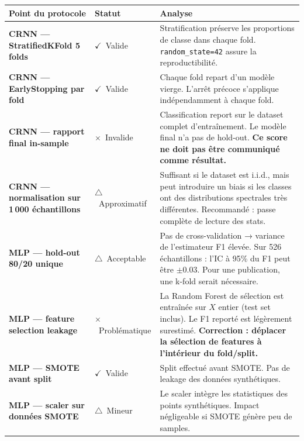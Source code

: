 \documentclass[11pt,a4paper]{article}
\newcommand{\param}[1]{\texttt{#1}}
\newcommand{\ok}{{\color{okborder}$\checkmark$}}
\newcommand{\warn}{{\color{warnborder}$\triangle$}}
\newcommand{\fail}{{\color{dangerBorder}$\times$}}
\begin{document}
\begin{table}[h!]
\centering
\renewcommand{\arraystretch}{1.5}
\begin{tabular}{p{5.5cm}p{1.5cm}p{7cm}}
\toprule
\textbf{Point du protocole} & \textbf{Statut} & \textbf{Analyse} \\
\midrule

\textbf{CRNN — StratifiedKFold 5 folds}
& \ok~Valide
& Stratification préserve les proportions de classe dans chaque fold.
  \param{random\_state=42} assure la reproductibilité. \\

\textbf{CRNN — EarlyStopping par fold}
& \ok~Valide
& Chaque fold repart d'un modèle vierge. L'arrêt précoce s'applique
  indépendamment à chaque fold. \\

\textbf{CRNN — rapport final in-sample}
& \fail~Invalide
& Classification report sur le dataset complet d'entraînement.
  Le modèle final n'a pas de hold-out.
  \textbf{Ce score ne doit pas être communiqué comme résultat.} \\

\textbf{CRNN — normalisation sur 1\,000 échantillons}
& \warn~Approximatif
& Suffisant si le dataset est i.i.d., mais peut introduire un biais
  si les classes ont des distributions spectrales très différentes.
  Recommandé : passe complète de lecture des stats. \\

\textbf{MLP — hold-out 80/20 unique}
& \warn~Acceptable
& Pas de cross-validation → variance de l'estimateur F1 élevée.
  Sur 526 échantillons : l'IC à 95\% du F1 peut être $\pm 0.03$.
  Pour une publication, une k-fold serait nécessaire. \\

\textbf{MLP — feature selection leakage}
& \fail~Problématique
& La Random Forest de sélection est entraînée sur $X$ entier
  (test set inclus). Le F1 reporté est légèrement surestimé.
  \textbf{Correction : déplacer la sélection de features à l'intérieur du fold/split.} \\

\textbf{MLP — SMOTE avant split}
& \ok~Valide
& Split effectué avant SMOTE. Pas de leakage des données synthétiques. \\

\textbf{MLP — scaler sur données SMOTE}
& \warn~Mineur
& Le scaler intègre les statistiques des points synthétiques.
  Impact négligeable si SMOTE génère peu de samples. \\


\end{tabular}
\end{table}
\end{document}
